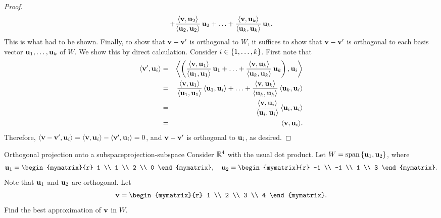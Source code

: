 \begin{proof}
\begin{equation*}
    + \frac{\iprod{\vect{v},\vect{u}_2}}{\iprod{\vect{u}_2,\vect{u}_2}}\,\vect{u}_2
    + \ldots
    + \frac{\iprod{\vect{v},\vect{u}_k}}{\iprod{\vect{u}_k,\vect{u}_k}}\,\vect{u}_k.
  \end{equation*}
  This is what had to be shown. Finally, to show that
  $\vect{v}-\vect{v}'$ is orthogonal to $W$, it suffices to show that
  $\vect{v}-\vect{v}'$ is orthogonal to each basis vector
  $\vect{u}_1,\ldots,\vect{u}_k$ of $W$. We show this by direct calculation.
  Consider $i\in\left\{1,\ldots,k\right\}$. First note that
  \begin{eqnarray*}
    \iprod{\vect{v}',\vect{u}_i}
    &=& \bigiprod{\paren{
        \frac{\iprod{\vect{v},\vect{u}_1}}{\iprod{\vect{u}_1,\vect{u}_1}}\,\vect{u}_1
        + \ldots
        + \frac{\iprod{\vect{v},\vect{u}_k}}{\iprod{\vect{u}_k,\vect{u}_k}}\,\vect{u}_k}
        ,\vect{u}_i}\\
    &=&
        \frac{\iprod{\vect{v},\vect{u}_1}}{\iprod{\vect{u}_1,\vect{u}_1}}\,\iprod{\vect{u}_1,\vect{u}_i}
        + \ldots
        + \frac{\iprod{\vect{v},\vect{u}_k}}{\iprod{\vect{u}_k,\vect{u}_k}}\,\iprod{\vect{u}_k,\vect{u}_i}
    \\
    &=& \frac{\iprod{\vect{v},\vect{u}_i}}{\iprod{\vect{u}_i,\vect{u}_i}}\,\iprod{\vect{u}_i,\vect{u}_i}\\
    &=& \iprod{\vect{v},\vect{u}_i}.
  \end{eqnarray*}
  Therefore,
  $\iprod{\vect{v}-\vect{v}',\vect{u}_i} = \iprod{\vect{v},\vect{u}_i}
  - \iprod{\vect{v}',\vect{u}_i} = 0$, and $\vect{v}-\vect{v}'$ is
  orthogonal to $\vect{u}_i$, as desired.
\end{proof}

\begin{example}{Orthogonal projection onto a subspace}{projection-subspace}
  Consider $\mathbb{R}^4$ with the usual dot product. Let
  $W=\sspan\set{\vect{u}_1,\vect{u}_2}$, where
  \begin{equation*}
    \vect{u}_1 = \begin{mymatrix}{r} 1 \\ 1 \\ 2 \\ 0 \end{mymatrix}, \quad
    \vect{u}_2 = \begin{mymatrix}{r} -1 \\ -1 \\ 1 \\ 3 \end{mymatrix}.
  \end{equation*}
  Note that $\vect{u}_1$ and $\vect{u}_2$ are orthogonal. Let
  \begin{equation*}
    \vect{v} = \begin{mymatrix}{r} 1 \\ 2 \\ 3 \\ 4 \end{mymatrix}.
  \end{equation*}
  Find the best approximation of $\vect{v}$ in $W$.
\end{example}

